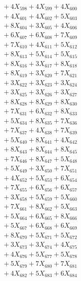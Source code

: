 \documentclass[a4paper,10pt]{article}
\begin{document}
{\begin{align}
&\;  + 4 X_{598} + 4 X_{599} + 4 X_{600} \\[0.3ex]
&\;  + 4 X_{601} + 4 X_{602} + 5 X_{603} \\[0.3ex]
&\;  + 8 X_{604} + 3 X_{605} + 4 X_{606} \\[0.3ex]
&\;  + 6 X_{607} + 6 X_{608} + 7 X_{609} \\[0.5ex]\allowbreak
&\;  + 7 X_{610} + 4 X_{611} + 5 X_{612} \\[0.3ex]
&\;  + 8 X_{613} + 5 X_{614} + 5 X_{615} \\[0.3ex]
&\;  + 8 X_{616} + 3 X_{617} + 8 X_{618} \\[0.3ex]
&\;  + 8 X_{619} + 3 X_{620} + 7 X_{621} \\[0.3ex]
&\;  + 3 X_{622} + 3 X_{623} + 3 X_{624} \\[0.3ex]
&\;  + 3 X_{625} + 3 X_{626} + 3 X_{627} \\[0.3ex]
&\;  + 8 X_{628} + 8 X_{629} + 8 X_{630} \\[0.3ex]
&\;  + 7 X_{631} + 6 X_{632} + 8 X_{633} \\[0.3ex]
&\;  + 5 X_{634} + 8 X_{635} + 7 X_{636} \\[0.3ex]
&\;  + 7 X_{637} + 4 X_{638} + 7 X_{639} \\[0.5ex]\allowbreak
&\;  + 5 X_{640} + 8 X_{641} + 4 X_{642} \\[0.3ex]
&\;  + 8 X_{643} + 8 X_{644} + 8 X_{645} \\[0.3ex]
&\;  + 7 X_{646} + 8 X_{647} + 5 X_{648} \\[0.3ex]
&\;  + 5 X_{649} + 3 X_{650} + 7 X_{651} \\[0.3ex]
&\;  + 4 X_{652} + 5 X_{653} + 6 X_{654} \\[0.3ex]
&\;  + 7 X_{655} + 6 X_{656} + 6 X_{657} \\[0.3ex]
&\;  + 3 X_{658} + 5 X_{659} + 5 X_{660} \\[0.3ex]
&\;  + 7 X_{661} + 8 X_{662} + 5 X_{663} \\[0.3ex]
&\;  + 5 X_{664} + 6 X_{665} + 8 X_{666} \\[0.3ex]
&\;  + 5 X_{667} + 6 X_{668} + 6 X_{669} \\[0.5ex]\allowbreak
&\;  + 8 X_{670} + 5 X_{671} + 5 X_{672} \\[0.3ex]
&\;  + 3 X_{673} + 3 X_{674} + 4 X_{675} \\[0.3ex]
&\;  + 4 X_{676} + 5 X_{677} + 5 X_{678} \\[0.3ex]
&\;  + 5 X_{679} + 7 X_{680} + 7 X_{681} \\[0.3ex]
&\;  + 4 X_{682} + 5 X_{683} + 6 X_{684} \\[0.3ex]

\end{align}}
\end{document}
